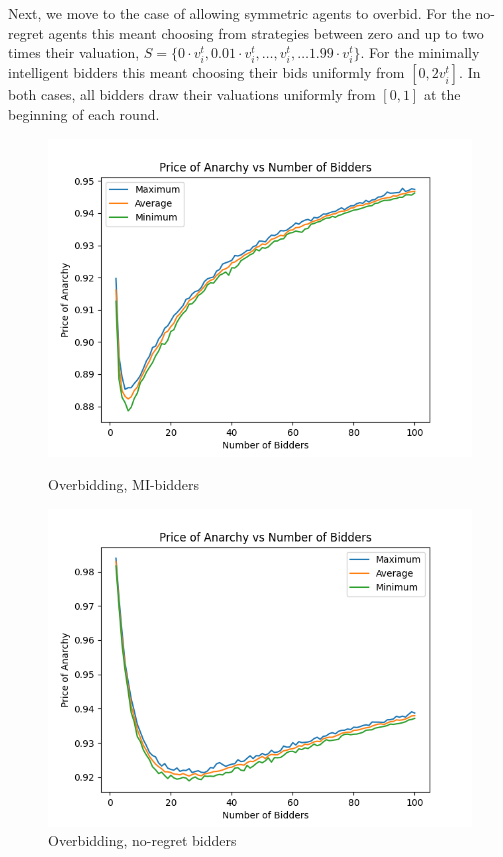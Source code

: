 \documentclass[12pt,twoside]{reedthesis}
\begin{document}
Next, we move to the case of allowing symmetric agents to overbid. For the no-regret agents this meant choosing from strategies between zero and up to two times their valuation, $S = \{0 \cdot v_i^t, 0.01 \cdot v_i^t, \ldots,  v_i^t, \ldots 1.99 \cdot v_i^t\}$. For the minimally intelligent bidders this meant choosing their bids uniformly from $[0, 2v_i^t]$. In both cases, all bidders draw their valuations uniformly from $[0,1]$ at the beginning of each round.

\begin{figure}
	\centering
	\begin{minipage}{0.49\textwidth}
		\centering
		\includegraphics[scale=0.5]{Figures/zi_symmetric_overbidding}
		\caption{Overbidding, MI-bidders}
		\label{figure:mi_overbidders}
	\end{minipage}
	\begin{minipage}{0.49\textwidth}
		\centering
		\includegraphics[scale=0.5]{Figures/symmetric_overbidding}
		\caption{Overbidding, no-regret bidders}
		\label{figure:overbidders}
	\end{minipage}
\end{figure}
\end{document}
